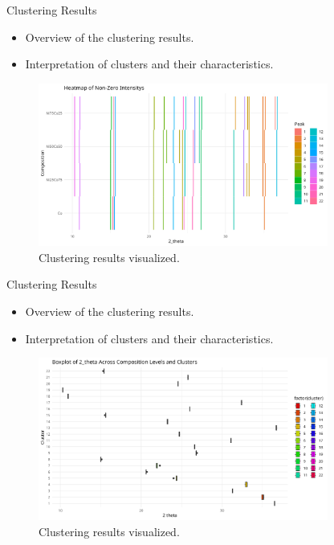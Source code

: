 \documentclass[aspectratio=169]{beamer}
\begin{document}
\begin{frame}{Clustering Results}
    \begin{itemize}
        \item Overview of the clustering results.
        \item Interpretation of clusters and their characteristics.
    \end{itemize}

    \begin{figure}
        \includegraphics[width=0.85\textwidth]{../plot/peak_clusters.png}
        \caption{Clustering results visualized.}
    \end{figure}
\end{frame}

\begin{frame}{Clustering Results}
    \begin{itemize}
        \item Overview of the clustering results.
        \item Interpretation of clusters and their characteristics.
    \end{itemize}

    \begin{figure}
        \includegraphics[width=0.85\textwidth]{../plot/theta.png}
        \caption{Clustering results visualized.}
    \end{figure}
\end{frame}
\end{document}
